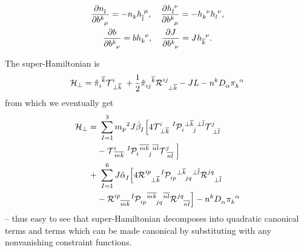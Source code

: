 \documentclass[aps,prd,reprint,preprintnumbers,superscriptaddress,showpacs,floatfix]{revtex4-2}
\begin{document}
\begin{equation}
  \begin{gathered}
    \frac{\partial\tensor{n}{_l}}{\partial\tensor{b}{^k_\mu}}=-\tensor{n}{_k}\tensor{h}{_{\overline{l}}^\mu}, \quad \frac{\partial\tensor{h}{_l^\nu}}{\partial\tensor{b}{^k_\mu}}=-\tensor{h}{_k^\nu}\tensor{h}{_l^\nu},\\
    \frac{\partial b}{\partial\tensor{b}{^k_\nu}}=b\tensor{h}{_k^\nu}, \quad \frac{\partial J}{\partial\tensor{b}{^k_\nu}}=J\tensor{h}{_{\overline{k}}^\nu}.
  \end{gathered}
  \label{<+label+>}
\end{equation}

The super-Hamiltonian is
\begin{equation}
  \mathcal{  H}_{\perp}=\tensor{\hat{\pi}}{_i^{\overline{k}}}\tensor{\mathcal{  T}}{^i_{\perp\overline{k}}}+\frac{1}{2}\tensor{\hat{\pi}}{_{ij}^{\overline{k}}}\tensor{\mathcal{  R}}{^{ij}_{\perp\overline{k}}}-JL-\tensor{n}{^k}\tensor{D}{_\alpha}\tensor{\pi}{_k^\alpha}
  \label{<+label+>}
\end{equation}
from which we eventually get
\begin{equation}
\begin{aligned}
  \mathcal{  H}_{\perp}=&\ \sum_{I=1}^{3}{m_\text{p}}^2J\tensor{\hat{\beta}}{_{I}}\Big[4\tensor{\mathcal{  T}}{^i_{\perp\overline{k}}}\tensor[^I]{\mathcal{  P}}{_i^{\perp\overline{k}}_j^{\perp\overline{l}}}\tensor{\mathcal{  T}}{^j_{\perp\overline{l}}}\\
  &-\tensor{\mathcal{  T}}{^i_{\overline{mk}}}\tensor[^I]{\mathcal{  P}}{_i^{\overline{mk}}_j^{\overline{nl}}}\tensor{\mathcal{  T}}{^j_{\overline{nl}}}\Big]\\
  +&\ \sum_{I=1}^{6}J\tensor{\hat{\alpha}}{_{I}}\Big[4\tensor{\mathcal{  R}}{^{ip}_{\perp\overline{k}}}\tensor[^I]{\mathcal{  P}}{_{ip}^{\perp\overline{k}}_{jq}^{\perp\overline{l}}}\tensor{\mathcal{  R}}{^{jq}_{\perp\overline{l}}}\\
  &-\tensor{\mathcal{  R}}{^{ip}_{\overline{mk}}}\tensor[^I]{\mathcal{  P}}{_{ip}^{\overline{mk}}_{jq}^{\overline{nl}}}\tensor{\mathcal{  R}}{^{jq}_{\overline{nl}}}\Big]-\tensor{n}{^k}\tensor{D}{_\alpha}\tensor{\pi}{_k^\alpha}\\
  \label{<+label+>}
\end{aligned}
\end{equation}
-- thus easy to see that super-Hamiltonian decomposes into quadratic canonical terms and terms which can be made canonical by substituting with any nonvanishing constraint functions.
\end{document}
